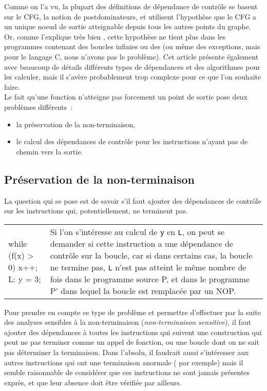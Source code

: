 Comme on l'a vu,
la plupart des définitions de dépendance de contrôle se basent
sur le CFG, la notion de postdominateurs, et utilisent l'hypothèse
que le CFG a un unique noeud de sortie \nE{} atteignable depuis tous les
autres points du graphe. Or, comme l'explique très bien \cite{ranganath04new},
cette hypothèse ne tient plus dans les programmes contenant
des boucles infinies ou des  (ou même des exceptions,
mais pour le langage C, nous n'avons pas le problème).
Cet article présente également avec beaucoup de détails 
différents types de dépendances et des algorithmes pour les calculer,
mais il s'avère probablement trop complexe pour ce que l'on souhaite faire.\\

Le fait qu'une fonction n'atteigne pas forcement un point de sortie pose deux
problèmes différents~:
\begin{itemize}
  \item la préservation de la non-terminaison,
  \item le calcul des dépendances de contrôle pour les instructions
    n'ayant pas de chemin vers la sortie.
\end{itemize}

\subsection{Préservation de la non-terminaison}

La question qui se pose est de savoir s'il faut ajouter des dépendances de
contrôle sur les instructions qui, potentiellement, ne terminent pas.

\begin{exemple}
    \begin{tabular}{p{4.5cm}p{\linewidth-5.5cm}}
\begin{clisting}
while (f(x) > 0) x++;
L: y = 3;
\end{clisting}
&
Si l'on s'intéresse au calcul de {\tt y} en {\tt L}, on peut se demander si
cette instruction a une dépendance de contrôle sur la boucle,
car si dans certains cas, la boucle ne termine pas,
{\tt L} n'est pas atteint le même nombre de fois
dans le programme source P, et dans le programme P' dans lequel la boucle est
remplacée par un NOP.

\end{tabular}
\end{exemple}

Pour prendre en compte ce type de problème et permettre d'effectuer par la suite
des analyses sensibles à la non-terminaison ({\it non-terminaison sensitive}),
il faut ajouter des dépendances à toutes les instructions qui suivent
une construction qui peut ne pas terminer comme un appel de fonction,
ou une boucle dont on ne sait pas déterminer la terminaison.
Dans l'absolu, il faudrait aussi s'intéresser aux autres instructions qui ont
une terminaison anormale ( par exemple) mais il semble
raisonnable de considérer que ces instructions ne sont jamais présentes exprès,
et que leur absence doit être vérifiée par ailleurs.

